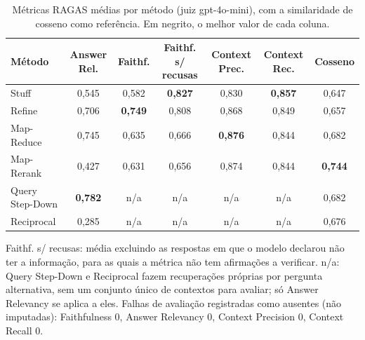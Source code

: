 \begin{table}[!t]
\centering
\footnotesize
\setlength{\tabcolsep}{4pt}
\caption{Métricas RAGAS médias por método (juiz gpt-4o-mini), com a similaridade de cosseno como referência. Em negrito, o melhor valor de cada coluna.}
\label{tab:ragas_metodos}
\begin{tabular}{lcccccc}
\toprule
Método & Answer Rel. & Faithf. & Faithf. s/ recusas & Context Prec. & Context Rec. & Cosseno \\
\midrule
Stuff & 0,545 & 0,582 & \textbf{0,827} & 0,830 & \textbf{0,857} & 0,647 \\
Refine & 0,706 & \textbf{0,749} & 0,808 & 0,868 & 0,849 & 0,657 \\
Map-Reduce & 0,745 & 0,635 & 0,666 & \textbf{0,876} & 0,844 & 0,682 \\
Map-Rerank & 0,427 & 0,631 & 0,656 & 0,874 & 0,844 & \textbf{0,744} \\
Query Step-Down & \textbf{0,782} & n/a & n/a & n/a & n/a & 0,682 \\
Reciprocal & 0,285 & n/a & n/a & n/a & n/a & 0,676 \\
\bottomrule
\end{tabular}
\par\smallskip\parbox{0.95\linewidth}{\footnotesize Faithf. s/ recusas: média excluindo as respostas em que o modelo declarou não ter a informação, para as quais a métrica não tem afirmações a verificar. n/a: Query Step-Down e Reciprocal fazem recuperações próprias por pergunta alternativa, sem um conjunto único de contextos para avaliar; só Answer Relevancy se aplica a eles. Falhas de avaliação registradas como ausentes (não imputadas): Faithfulness 0, Answer Relevancy 0, Context Precision 0, Context Recall 0.}
\end{table}
